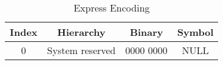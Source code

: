 \documentclass{article}
\begin{document}
\begin{table}[htbp]
\centering
\begin{tabular}{|c|c|c|c|}
\hline
Index   & Hierarchy         & Binary        & Symbol        \\ \hline
0       & System reserved   & 0000 0000     & NULL          \\ \hline

\end{tabular}
\caption{Express Encoding}
\end{table}
\end{document}
